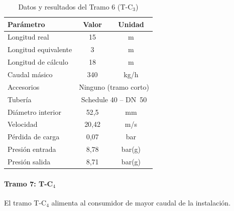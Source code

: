 \documentclass[12pt]{article}
\begin{document}
\begin{table}[H]
	\centering
	\caption{Datos y resultados del Tramo 6 (T-C$_3$)}
	\label{tab:tramo6}
	\begin{tabular}{lcc}
		\toprule
		\textbf{Parámetro}   & \textbf{Valor}                            & \textbf{Unidad} \\
		\midrule
		Longitud real        & 15                                        & m               \\
		Longitud equivalente & 3                                         & m               \\
		Longitud de cálculo  & 18                                        & m               \\
		Caudal másico        & 340                                       & kg/h            \\
		Accesorios           & \multicolumn{2}{c}{Ninguno (tramo corto)}                   \\
		Tubería              & \multicolumn{2}{c}{Schedule 40 -- DN~50}                    \\
		Diámetro interior    & 52{,}5                                    & mm              \\
		Velocidad            & 20{,}42                                   & m/s             \\
		Pérdida de carga     & 0{,}07                                    & bar             \\
		Presión entrada      & 8{,}78                                    & bar(g)          \\
		Presión salida       & 8{,}71                                    & bar(g)          \\
		\bottomrule
	\end{tabular}
\end{table}

\paragraph{Tramo 7: T-C$_4$}

El tramo T-C$_4$ alimenta al consumidor de mayor caudal de la instalación.
\end{document}
